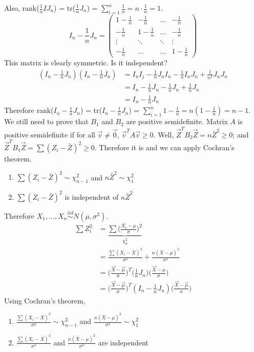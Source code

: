 \documentclass[12pt]{article}
\newcommand{\iid}{\stackrel{iid}{\sim}}
\begin{document}
Also, rank($\frac{1}{n}IJ_n$) = tr($\frac{1}{n}J_n$) = $\sum_{i=1}^n \frac{1}{n} = n \cdot \frac{1}{n} = 1$. 
$$ I_n - \frac{1}{n}J_n = \begin{pmatrix} 1 - \frac{1}{n} & - \frac{1}{n} & \dots & -\frac{1}{n} \\ - \frac{1}{n} & 1 - \frac{1}{n} & \dots & -\frac{1}{n} \\ \vdots & \ddots & \ddots & \vdots \\ -\frac{1}{n} & \dots & \dots & 1 - \frac{1}{n} \end{pmatrix} $$ This matrix is clearly symmetric. Is it independent? 
$$ \begin{aligned} (I_n - \frac{1}{n}J_n)(I_n - \frac{1}{n}J_n) &= I_nI_j - \frac{1}{n}J_nI_n - \frac{1}{n}I_nJ_n + \frac{1}{n^2}J_nJ_n \\ &= I_n - \frac{1}{n}J_n - \frac{1}{n}J_n + \frac{1}{n}J_n \\ &= I_n - \frac{1}{n}J_n \end{aligned} $$ 
Therefore rank($I_n - \frac{1}{n}J_n$) = tr($I_n - \frac{1}{n}J_n$) = $\sum_{i = 1}^n 1 - \frac{1}{n} = n(1 - \frac{1}{n}) = n-1$. \\
We still need to prove that $B_1$ and $B_2$ are positive semidefinite. Matrix $A$ is positive semidefinite if for all $\vec{v} \neq \vec{0}$, $\vec{v}^TA\vec{v} \geq 0$. Well, $\vec{Z}^TB_2\vec{Z} = n\bar{Z}^2 \geq 0$; and $\vec{Z}^TB_1\vec{Z} = \sum (Z_i - \bar{Z})^2 \geq 0$. Therefore it is and we can apply Cochran's theorem. \begin{enumerate} 
\item $\sum (Z_i - \bar{Z})^2 \sim \chi^2_{n-1}$ and $n\bar{Z}^2 \sim \chi_1^2$ 
\item $\sum (Z_i - \bar{Z})^2$ is independent of $n\bar{Z}^2$ \end{enumerate}  
Therefore $X_1, \dots, X_n \iid N(\mu, \sigma^2)$. 
$$\begin{aligned}  \sum Z_i^2 &= \underbrace{ \sum \Big( \frac{X_i - \mu}{\sigma}\Big)^2}_{\chi_k^2} \\ &= \frac{\sum (X_i - \bar{X})^2}{\sigma^2} + \frac{n(\bar{X} - \mu)^2}{\sigma^2} \\ &= \Big( \frac{\vec{X} - \vec{\mu}}{\sigma}\Big)^T\Big(\frac{1}{n}J_n\Big)\Big(\frac{\vec{X} - \mu}{\sigma}\Big) \\ &= \Big( \frac{\vec{X} - \vec{\mu}}{\sigma}\Big)^T(I_n - \frac{1}{n}J_n)\Big(\frac{\vec{X} - \vec{\mu}}{\sigma}\Big) \end{aligned} $$ 
Using Cochran's theorem, \begin{enumerate} 
\item $\frac{\sum (X_i - \bar{X})^2}{\sigma^2} \sim \chi^2_{n-1}$ and $\frac{n(\bar{X} - \mu)^2}{\sigma^2} \sim \chi_1^2$
\item $\frac{\sum (X_i - \bar{X})^2}{\sigma^2}$ and $\frac{n(\bar{X} - \mu)^2}{\sigma^2}$ are independent \end{enumerate} 
\end{document}

